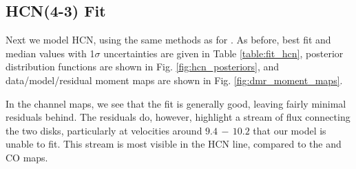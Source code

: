




\subsection{HCN(4-3) Fit}
\label{subsection:hcn_fit}

Next we model HCN, using the same methods as for \hco. As before, best fit and median values with 1$\sigma$  uncertainties are given in Table \ref{table:fit_hcn}, posterior distribution functions are shown in Fig. \ref{fig:hcn_posteriors}, and data/model/residual moment maps are shown in Fig. \ref{fig:dmr_moment_maps}.

In the channel maps, we see that the fit is generally good, leaving fairly minimal residuals behind. The residuals do, however, highlight a stream of flux connecting the two disks, particularly at velocities around $9.4\,-\,10.2$ \kms that our model is unable to fit. This stream is most visible in the HCN line, compared to the \hco and CO maps.


